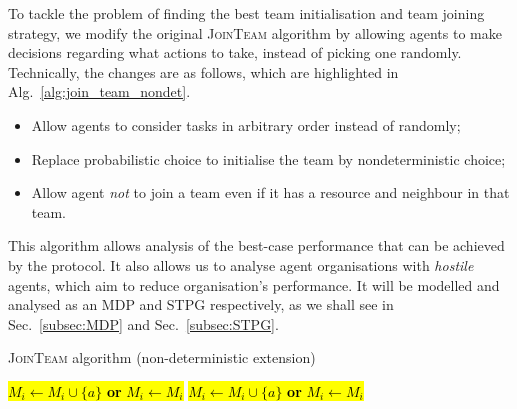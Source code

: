 \documentclass{llncs}
\begin{document}
To tackle the problem of finding the best team initialisation and team joining strategy, we modify the original \textsc{JoinTeam} algorithm by
allowing agents to make decisions regarding what actions to take, instead of picking one randomly. Technically, the changes are as follows, which
are highlighted in Alg.~\ref{alg:join_team_nondet}.
\begin{itemize}
 \item Allow agents to consider tasks in arbitrary order instead of randomly;
 \item Replace probabilistic choice to initialise the team by nondeterministic choice;
 \item Allow agent \emph{not} to join a team even if it has a resource and neighbour in that team.
\end{itemize}
This algorithm allows analysis of the best-case performance that can be achieved by the protocol.
It also allows us to analyse agent organisations with \emph{hostile} agents, which aim to reduce organisation's performance. It will be modelled and analysed as an MDP and STPG respectively, as we shall see in Sec.~\ref{subsec:MDP} and Sec.~\ref{subsec:STPG}.
\begin{algorithm}[h]
\caption{\textsc{JoinTeam} algorithm (non-deterministic extension)}
\label{alg:join_team_nondet}
\begin{scriptsize}
\begin{algorithmic}
     
       
	 
	    \State \hl{$M_i \leftarrow M_i \cup \{a\}$  \textbf{or} $M_i \leftarrow M_i$} 
	\EndIf
       
	 
	  \State \hl{$M_i \leftarrow M_i \cup \{a\}$ \textbf{or} $M_i \leftarrow M_i$} 
	\EndIf
      \EndIf
    \EndIf
  \EndFor
\EndProcedure
\end{algorithmic}
\end{scriptsize}
\end{algorithm}
\end{document}
